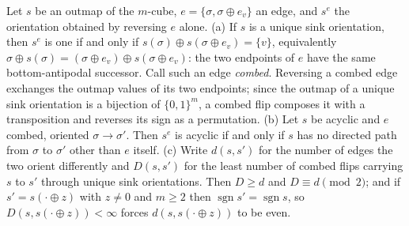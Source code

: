 
\begin{proposition}\label{dl:flippable}
Let $s$ be an outmap of the $m$-cube, $e=\{\sigma,\sigma\oplus e_v\}$ an edge, and $s^{e}$ the
orientation obtained by reversing $e$ alone.
(a) If $s$ is a unique sink orientation, then $s^{e}$ is one if and only if
$s(\sigma)\oplus s(\sigma\oplus e_v)=\{v\}$, equivalently
$\sigma\oplus s(\sigma)=(\sigma\oplus e_v)\oplus s(\sigma\oplus e_v)$: the two endpoints of $e$
have the same bottom-antipodal successor. Call such an edge \emph{combed}. Reversing a combed
edge exchanges the outmap values of its two endpoints; since the outmap of a unique sink
orientation is a bijection of $\{0,1\}^{m}$, a combed flip composes it with a transposition and
reverses its sign as a permutation.
(b) Let $s$ be acyclic and $e$ combed, oriented $\sigma\to\sigma'$. Then $s^{e}$ is acyclic if and
only if $s$ has no directed path from $\sigma$ to $\sigma'$ other than $e$ itself.
(c) Write $d(s,s')$ for the number of edges the two orient differently and $D(s,s')$ for the least
number of combed flips carrying $s$ to $s'$ through unique sink orientations. Then $D\ge d$ and
$D\equiv d\pmod 2$; and if $s'=s(\cdot\oplus z)$ with $z\ne0$ and $m\ge2$ then
$\operatorname{sgn}s'=\operatorname{sgn}s$, so $D(s,s(\cdot\oplus z))<\infty$ forces
$d(s,s(\cdot\oplus z))$ to be even.
\end{proposition}

